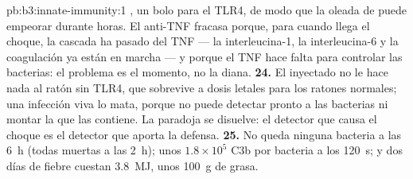 \begin{solution}{pb:b3:innate-immunity:1}
, un bolo para el TLR4, de modo que la oleada de
 puede empeorar durante horas. El anti-TNF fracasa porque, para
cuando llega el choque, la cascada ha pasado del TNF --- la
interleucina-1, la interleucina-6 y la coagulación ya están en marcha ---
y porque el TNF hace falta para controlar las bacterias: el problema es
el momento, no la diana.
\textbf{24.} El  inyectado no le hace nada al ratón sin
TLR4, que sobrevive a dosis letales para los ratones normales; una
infección  viva lo mata, porque no puede detectar pronto a
las bacterias ni montar la  que las contiene. La paradoja se
disuelve: el detector que causa el choque es el detector que aporta la
defensa.
\textbf{25.} No queda ninguna bacteria a las \qty{6}{h} (todas muertas a
las \qty{2}{h}); unos $1.8\times 10^{5}$ C3b por bacteria a los
\qty{120}{s}; y dos días de fiebre cuestan \qty{3.8}{MJ}, unos
\qty{100}{g} de grasa.
\end{solution}
